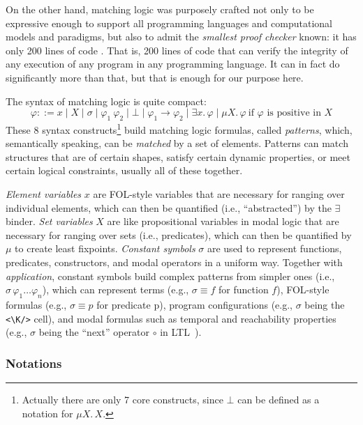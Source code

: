 \documentclass{article}
\theoremstyle{plain}
\theoremstyle{definition}
\newcommand{\ld}{\mathord{.\,}}
\newcommand{\imp}{\to}
\newcommand{\K}{$\mathbb{K}$\xspace}
\begin{document}
On the other hand, matching logic was purposely crafted not only to be expressive enough to support all programming languages and computational models and paradigms, but also to admit the \textit{smallest proof checker} known: it has only 200 lines of code \cite{CLTR21}.  That is, 200 lines of code that can verify the integrity of any execution of any program in any programming language.  It can in fact do significantly more than that, but that is enough for our purpose here.

The syntax of matching logic is quite compact:
\begin{equation}\label{eq:mlsyntax1}
\varphi ::=
x 
\mid X 
\mid \sigma
\mid \varphi_1 \  \varphi_2
\mid \bot
\mid \varphi_1 \imp \varphi_2
\mid \exists x \ld \varphi
\mid \mu X \ld \varphi \ \text{if $\varphi$ is positive in $X$}
\end{equation}
These 8 syntax constructs\footnote{Actually there are only 7 core constructs, since $\bot$ can be defined as a notation for $\mu X\ld X$.} build
matching logic formulas, called \emph{patterns},
which, semantically speaking, can be \emph{matched} by a set of elements. 
Patterns can match structures that are of certain shapes,
satisfy certain dynamic properties, or meet certain logical constraints,
usually all of these together.

\emph{Element variables} $x$ are FOL-style variables that are
necessary for ranging over individual elements, which can then be quantified (i.e., “abstracted”)
by the $\exists$ binder. \emph{Set variables} $X$ are like propositional variables in modal logic that are necessary
for ranging over sets (i.e., predicates), which can then be quantified by $\mu$ to create least fixpoints.
\emph{Constant symbols} $\sigma$ are used to represent functions, predicates, constructors, and modal operators in a
uniform way. Together with \emph{application}, constant symbols build complex patterns from simpler ones (i.e.,
$\sigma\,\varphi_1\ldots \varphi_n$), which can represent terms (e.g., $\sigma \equiv f$ for function $f$), FOL-style formulas (e.g., $\sigma \equiv p$
for predicate p), program configurations (e.g., $\sigma$ being the \verb|<\K/>| cell), and modal formulas such
as temporal and reachability properties (e.g., $\sigma$ being the “next” operator $\circ$ in LTL~\cite{CR19}).

\subsubsection{Notations} \label{sec:notations}
\end{document}
